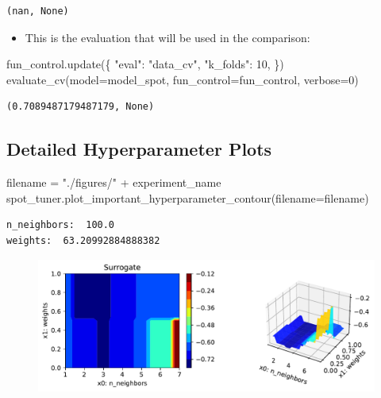 \documentclass[
  letterpaper,
  DIV=11,
  numbers=noendperiod]{scrreprt}
\newenvironment{Shaded}{\begin{snugshade}}{\end{snugshade}}
\newcommand{\DecValTok}[1]{\textcolor[rgb]{0.68,0.00,0.00}{#1}}
\newcommand{\NormalTok}[1]{\textcolor[rgb]{0.00,0.23,0.31}{#1}}
\newcommand{\OperatorTok}[1]{\textcolor[rgb]{0.37,0.37,0.37}{#1}}
\newcommand{\StringTok}[1]{\textcolor[rgb]{0.13,0.47,0.30}{#1}}
\providecommand{\tightlist}{%
  \setlength{\itemsep}{0pt}\setlength{\parskip}{0pt}}\usepackage{longtable,booktabs,array}
\begin{document}
\begin{verbatim}
(nan, None)
\end{verbatim}

\begin{itemize}
\tightlist
\item
  This is the evaluation that will be used in the comparison:
\end{itemize}

\begin{Shaded}
\begin{Highlighting}[]
\NormalTok{fun\_control.update(\{}
     \StringTok{"eval"}\NormalTok{: }\StringTok{"data\_cv"}\NormalTok{,}
     \StringTok{"k\_folds"}\NormalTok{: }\DecValTok{10}\NormalTok{,}
\NormalTok{\})}
\NormalTok{evaluate\_cv(model}\OperatorTok{=}\NormalTok{model\_spot, fun\_control}\OperatorTok{=}\NormalTok{fun\_control, verbose}\OperatorTok{=}\DecValTok{0}\NormalTok{)}
\end{Highlighting}
\end{Shaded}

\begin{verbatim}
(0.7089487179487179, None)
\end{verbatim}

\hypertarget{detailed-hyperparameter-plots-6}{%
\subsection{Detailed Hyperparameter
Plots}\label{detailed-hyperparameter-plots-6}}

\begin{Shaded}
\begin{Highlighting}[]
\NormalTok{filename }\OperatorTok{=} \StringTok{"./figures/"} \OperatorTok{+}\NormalTok{ experiment\_name}
\NormalTok{spot\_tuner.plot\_important\_hyperparameter\_contour(filename}\OperatorTok{=}\NormalTok{filename)}
\end{Highlighting}
\end{Shaded}

\begin{verbatim}
n_neighbors:  100.0
weights:  63.20992884888382
\end{verbatim}

\begin{figure}[H]

{\centering \includegraphics{19_spot_hpt_sklearn_multiclass_classification_knn_files/figure-pdf/cell-46-output-2.pdf}

}

\end{figure}
\end{document}
